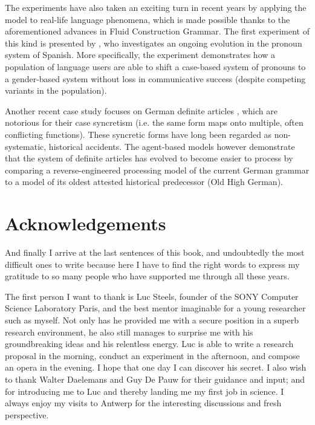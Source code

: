The experiments have also taken an exciting turn in recent years by applying the model to real-life language phenomena, which is made possible thanks to the aforementioned advances in Fluid Construction Grammar. The first experiment of this kind is presented by \citet{vantrijp10spanish}, who investigates an ongoing evolution in the pronoun system of Spanish. More specifically, the experiment demonstrates how a population of language users are able to shift a case-based system of pronouns to a gender-based system without loss in communicative success (despite competing variants in the population).

Another recent case study focuses on German definite articles \citep{vantrijp:12e,vantrijp:12c,vantrijp2013ldc,vantrijp14fitness}, which are notorious for their case syncretism (i.e. the same form maps onto multiple, often conflicting functions). These syncretic forms have long been regarded as non-systematic, historical accidents. The agent-based models however demonstrate that the system of definite articles has evolved to become easier to process by comparing a reverse-engineered processing model of the current German grammar to a model of its oldest attested historical predecessor (Old High German).

\section*{Acknowledgements}

And finally I arrive at the last sentences of this book, and undoubtedly the most difficult ones to write because here I have to find the right words to express my gratitude to so many people who have supported me through all these years.

The first person I want to thank is Luc Steels, founder of the SONY Computer Science Laboratory Paris, and the best mentor imaginable for a young researcher such as myself. Not only has he provided me with a secure position in a superb research environment, he also still manages to surprise me with his groundbreaking ideas and his relentless energy. Luc is able to write a research proposal in the morning, conduct an experiment in the afternoon, and compose an opera in the evening. I hope that one day I can discover his secret. I also wish to thank Walter Daelemans and Guy De Pauw for their guidance and input; and for introducing me to Luc and thereby landing me my first job in science. I always enjoy my visits to Antwerp for the interesting discussions and fresh perspective.

